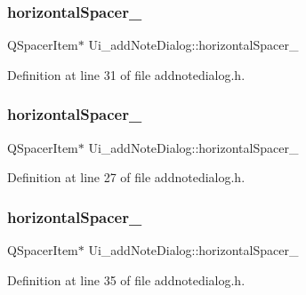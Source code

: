 \subsubsection{\texorpdfstring{horizontal\+Spacer\+\_}{horizontalSpacer\_2}}
{\footnotesize\ttfamily Q\+Spacer\+Item$\ast$ Ui\+\_\+add\+Note\+Dialog\+::horizontal\+Spacer\+\_}



Definition at line 31 of file addnotedialog.\+h.

\hypertarget{classUi__addNoteDialog_a790839063730f8529b1ee5c38bcea903}{}\label{classUi__addNoteDialog_a790839063730f8529b1ee5c38bcea903} 
\subsubsection{\texorpdfstring{horizontal\+Spacer\+\_}{horizontalSpacer\_5}}
{\footnotesize\ttfamily Q\+Spacer\+Item$\ast$ Ui\+\_\+add\+Note\+Dialog\+::horizontal\+Spacer\+\_}



Definition at line 27 of file addnotedialog.\+h.

\hypertarget{classUi__addNoteDialog_a2e0afdb4de479696f7488193836420bd}{}\label{classUi__addNoteDialog_a2e0afdb4de479696f7488193836420bd} 
\subsubsection{\texorpdfstring{horizontal\+Spacer\+\_}{horizontalSpacer\_6}}
{\footnotesize\ttfamily Q\+Spacer\+Item$\ast$ Ui\+\_\+add\+Note\+Dialog\+::horizontal\+Spacer\+\_}



Definition at line 35 of file addnotedialog.\+h.

\hypertarget{classUi__addNoteDialog_a2f452da1121f801c554ea1d45b776c6b}{}\label{classUi__addNoteDialog_a2f452da1121f801c554ea1d45b776c6b} 
